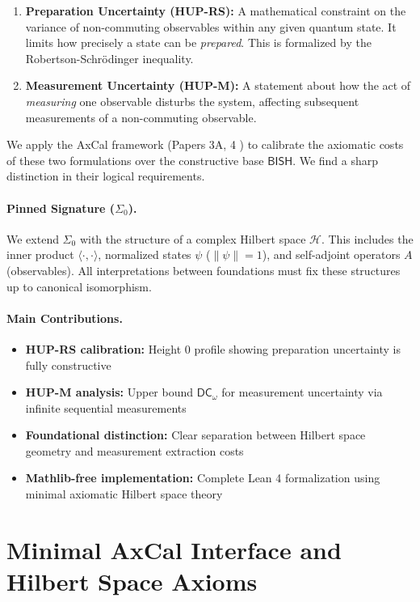 \documentclass[11pt]{article}
\newcommand{\DCw}{\mathsf{DC}_{\omega}}
\newcommand{\BISH}{\mathsf{BISH}}
\newcommand{\SigmaZero}{\Sigma_{0}}
\newcommand{\Hil}{\mathcal{H}}
\newcommand{\ip}[2]{\langle #1, #2 \rangle}
\theoremstyle{plain}
\theoremstyle{definition}
\theoremstyle{remark}
\begin{document}
\begin{enumerate}
\item \textbf{Preparation Uncertainty (HUP-RS):} A mathematical constraint on the variance of non-commuting observables within any given quantum state. It limits how precisely a state can be \emph{prepared}. This is formalized by the Robertson-Schrödinger inequality.
\item \textbf{Measurement Uncertainty (HUP-M):} A statement about how the act of \emph{measuring} one observable disturbs the system, affecting subsequent measurements of a non-commuting observable.
\end{enumerate}

We apply the AxCal framework (Papers 3A, 4 \cite{Paper3A, Paper4}) to calibrate the axiomatic costs of these two formulations over the constructive base $\BISH$. We find a sharp distinction in their logical requirements.

\paragraph{Pinned Signature ($\SigmaZero$).}
We extend $\SigmaZero$ with the structure of a complex Hilbert space $\Hil$. This includes the inner product $\ip{\cdot}{\cdot}$, normalized states $\psi$ ($\|\psi\|=1$), and self-adjoint operators $A$ (observables). All interpretations between foundations must fix these structures up to canonical isomorphism.

\paragraph{Main Contributions.}
\begin{itemize}
\item \textbf{HUP-RS calibration:} Height 0 profile showing preparation uncertainty is fully constructive
\item \textbf{HUP-M analysis:} Upper bound $\DCw$ for measurement uncertainty via infinite sequential measurements  
\item \textbf{Foundational distinction:} Clear separation between Hilbert space geometry and measurement extraction costs
\item \textbf{Mathlib-free implementation:} Complete Lean 4 formalization using minimal axiomatic Hilbert space theory
\end{itemize}

\section{Minimal AxCal Interface and Hilbert Space Axioms}
\end{document}

